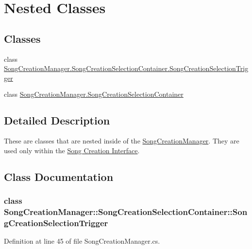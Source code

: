 \hypertarget{group___s_c_m_nest_class}{}\section{Nested Classes}
\label{group___s_c_m_nest_class}
\subsection*{Classes}
\begin{DoxyCompactItemize}
\item 
class \hyperlink{group___s_c_m_nest_class_class_song_creation_manager_1_1_song_creation_selection_container_1_1_song_creation_selection_trigger}{Song\+Creation\+Manager.\+Song\+Creation\+Selection\+Container.\+Song\+Creation\+Selection\+Trigger}
\item 
class \hyperlink{group___s_c_m_nest_class_class_song_creation_manager_1_1_song_creation_selection_container}{Song\+Creation\+Manager.\+Song\+Creation\+Selection\+Container}
\end{DoxyCompactItemize}


\subsection{Detailed Description}
These are classes that are nested inside of the \hyperlink{class_song_creation_manager}{Song\+Creation\+Manager}. They are used only within the \hyperlink{group___doc_s_c}{Song Creation Interface}. 

\subsection{Class Documentation}
\label{class_song_creation_manager_1_1_song_creation_selection_container_1_1_song_creation_selection_trigger}
\subsubsection{class Song\+Creation\+Manager\+:\+:Song\+Creation\+Selection\+Container\+:\+:Song\+Creation\+Selection\+Trigger}


Definition at line 45 of file Song\+Creation\+Manager.\+cs.

